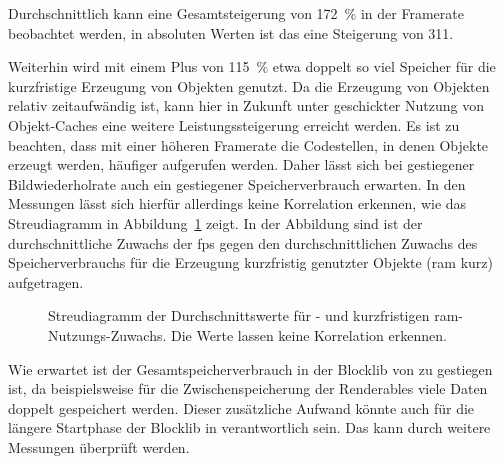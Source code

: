 Durchschnittlich kann eine Gesamtsteigerung von \SI{172}{\percent} in der Framerate beobachtet werden, in absoluten Werten ist das eine Steigerung von \SI{311}{\fps}.

Weiterhin wird mit einem Plus von \SI{115}{\percent} etwa doppelt so viel Speicher für die kurzfristige Erzeugung von Objekten genutzt. Da die Erzeugung von Objekten relativ zeitaufwändig ist, kann hier in Zukunft unter geschickter Nutzung von Objekt-Caches eine weitere Leistungssteigerung erreicht werden. Es ist zu beachten, dass mit einer höheren Framerate die Codestellen, in denen Objekte erzeugt werden, häufiger aufgerufen werden. Daher lässt sich bei gestiegener Bildwiederholrate auch ein gestiegener Speicherverbrauch erwarten. In den Messungen lässt sich hierfür allerdings keine Korrelation erkennen, wie das Streudiagramm in Abbildung~\ref{fig:Streudiagramm} zeigt. In der Abbildung sind ist der durchschnittliche Zuwachs der \ac{fps} gegen den durchschnittlichen Zuwachs des Speicherverbrauchs für die Erzeugung kurzfristig genutzter Objekte (\ac{ram} kurz) aufgetragen. 
\begin{figure}
	\centering
		\caption[Streudiagramm der Durchschnittswerte für - und kurzfristigen -Nutzungs-Zuwachs.]{Streudiagramm der Durchschnittswerte für \si{\fps}- und kurzfristigen \ac{ram}-Nutzungs-Zuwachs. Die Werte lassen keine Korrelation erkennen.}\label{fig:Streudiagramm}
\end{figure}

Wie erwartet ist der Gesamtspeicherverbrauch in der Blocklib von \sysA{} zu \sysB{} gestiegen ist, da beispielsweise für die Zwischenspeicherung der Renderables viele Daten doppelt gespeichert werden. 
Dieser zusätzliche Aufwand könnte auch für die längere Startphase der Blocklib in \sysB{} verantwortlich sein. Das kann durch weitere Messungen überprüft werden.